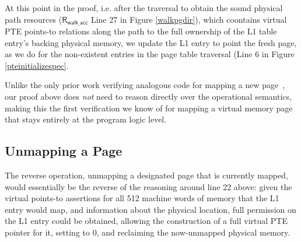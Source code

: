 At this point in the proof, i.e. after the traversal to obtain the sound physical path resources ($\textsf{R}_{\textsf{walk\_acc}}$ Line 27 in Figure \ref{walkpgdir}), which coontains
virtual PTE points-to relations along the path to the full ownership of the L1 table entry's backing physical memory, we update the L1 entry to point the fresh page, as we do for the non-existent entries in the page table traversal (Line 6 in Figure \ref{pteinitializespec}.   

Unlike the only prior work verifying analogous code for mapping a new page~\cite{kolanski08vstte,kolanski09tphols}, our proof above
does \emph{not} need to reason directly over the operational semantics,
making this the first verification we know of for mapping a virtual memory page that 
stays entirely at the program logic level.
\ifPLDI
\else
\subsection{Unmapping a Page}
The reverse operation, unmapping a designated page that is currently mapped,
would essentially be the reverse of
the reasoning around line 22 above: given the virtual points-to assertions for all 512
machine words of memory that the L1 entry would map,
and information about the physical location, 
full permission on the L1 entry could be obtained, allowing the construction of a
full virtual PTE pointer for it, setting to 0, and reclaiming the now-unmapped physical memory.
\fi


